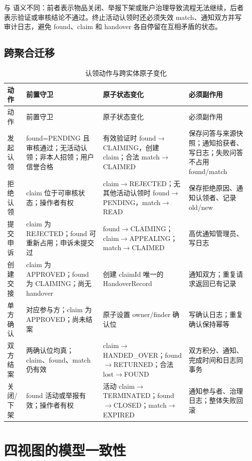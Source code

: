  与  语义不同：前者表示物品关闭、举报下架或账户治理导致流程无法继续，后者表示验证或审核结论不通过。终止活动认领时还必须失效 match、通知双方并写审计日志，避免 found、claim 和 handover 各自停留在互相矛盾的状态。

\subsection{跨聚合迁移}

\small
\begin{longtable}{L{2.1cm} L{3.3cm} L{5.2cm} L{3.4cm}}
  \caption{认领动作与跨实体原子变化}\label{tab:cross-state}\\
  \toprule
  动作 & 前置守卫 & 原子状态变化 & 必须副作用 \\
  \midrule
  \endfirsthead
  \toprule
  动作 & 前置守卫 & 原子状态变化 & 必须副作用 \\
  \midrule
  \endhead
  发起认领 & found=PENDING 且审核通过；无活动认领；非本人招领；用户信誉合格 & 有效验证时 found$\rightarrow$CLAIMING，创建 claim；合法 match$\rightarrow$CLAIMED & 保存问答与来源快照；通知拾获者、写日志；失败问答不占用 found/match \\
  拒绝认领 & claim 位于可审核状态；操作者有权 & claim$\rightarrow$REJECTED；无其他活动认领时 found$\rightarrow$PENDING，match$\rightarrow$READ & 保存拒绝原因、通知认领者、记录 old/new \\
  提交申诉 & claim 为 REJECTED；found 可重新占用；申诉未提交过 & found$\rightarrow$CLAIMING；claim$\rightarrow$APPEALING；match$\rightarrow$CLAIMED & 高优通知管理员、写日志 \\
  创建交接 & claim 为 APPROVED；found 为 CLAIMING；尚无 handover & 创建 claimId 唯一的 HandoverRecord & 通知双方；重复请求返回已有记录 \\
  单方确认 & 对应参与方；claim 为 APPROVED；尚未结案 & 原子设置 owner/finder 确认位 & 写确认日志；重复确认保持幂等 \\
  双方结案 & 两确认位均真；claim、found、match 仍有效 & claim$\rightarrow$HANDED\_OVER；found$\rightarrow$RETURNED；合法 lost$\rightarrow$FOUND & 双方积分、通知、完成时间和日志同事务 \\
  关闭/下架 & found 活动或举报有效；操作者有权 & 活动 claim$\rightarrow$TERMINATED；found$\rightarrow$CLOSED；match$\rightarrow$EXPIRED & 通知参与者、治理日志；整体失败回滚 \\
  \bottomrule
\end{longtable}
\normalsize

\section{四视图的模型一致性}

